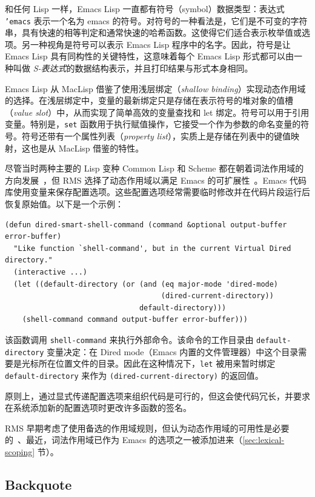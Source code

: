 \documentclass[format=acmsmall,screen]{acmart}
\begin{document}
和任何 Lisp 一样，Emacs Lisp 一直都有符号（symbol）数据类型：表达式 \texttt{'emacs} 表示一个名为 emacs 的符号。对符号的一种看法是，它们是不可变的字符串，具有快速的相等判定和通常快速的哈希函数。这使得它们适合表示枚举值或选项。另一种视角是符号可以表示 Emacs Lisp 程序中的名字。因此，符号是让 Emacs Lisp 具有同构性的关键特性，这意味着每个 Emacs Lisp 形式都可以由一种叫做 \textit{S-表达式}的数据结构表示，并且打印结果与形式本身相同。

Emacs Lisp 从 MacLisp 借鉴了使用浅层绑定（\emph{shallow binding}）实现动态作用域的选择。在浅层绑定中，变量的最新绑定只是存储在表示符号的堆对象的值槽（\emph{value slot}）中，从而实现了简单高效的变量查找和 let 绑定。符号可以用于引用变量。特别是，\texttt{set} 函数用于执行赋值操作，它接受一个作为参数的命名变量的符号。符号还带有一个属性列表（\textit{property list}），实质上是存储在列表中的键值映射，这也是从 MacLisp 借鉴的特性。

尽管当时两种主要的 Lisp 变种 Common Lisp 和 Scheme 都在朝着词法作用域的方向发展~\cite{CLtL1,R2RS}，但 RMS 选择了动态作用域以满足 Emacs 的可扩展性~\cite{Stallman1981}。Emacs 代码库使用变量来保存配置选项。这些配置选项经常需要临时修改并在代码片段运行后恢复原始值。以下是一个示例：
%
\begin{verbatim}
(defun dired-smart-shell-command (command &optional output-buffer error-buffer)
  "Like function `shell-command', but in the current Virtual Dired directory."
  (interactive ...)
  (let ((default-directory (or (and (eq major-mode 'dired-mode)
                                    (dired-current-directory))
                               default-directory)))
    (shell-command command output-buffer error-buffer)))
\end{verbatim}
%
该函数调用 \texttt{shell-command} 来执行外部命令。该命令的工作目录由 \texttt{default-directory} 变量决定：在 Dired mode（Emacs 内置的文件管理器）中这个目录需要是光标所在位置文件的目录。因此在这种情况下，\texttt{let} 被用来暂时绑定 \texttt{default-directory} 来作为 \texttt{(dired-current-directory)} 的返回值。

原则上，通过显式传递配置选项来组织代码是可行的，但这会使代码冗长，并要求在系统添加新的配置选项时更改许多函数的签名。

RMS 早期考虑了使用备选的作用域规则，但认为动态作用域的可用性是必要的~\cite{Stallman1981}、最近，词法作用域已作为 Emacs 的选项之一被添加进来（\ref{sec:lexical-scoping} 节）。

\clearpage

\subsection{Backquote}
\label{sec:backquote}
\end{document}
